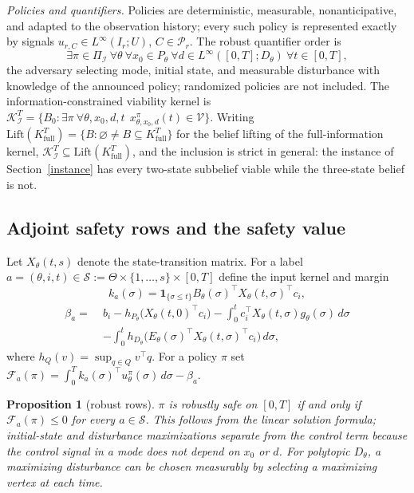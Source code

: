 \documentclass[10pt,twocolumn]{article}
\theoremstyle{plain}
\newtheorem{proposition}[theorem]{Proposition}
\theoremstyle{definition}
\theoremstyle{remark}
\begin{document}
\emph{Policies and quantifiers.} Policies are deterministic, measurable,
nonanticipative, and adapted to the observation history; every such policy is
represented exactly by signals \(u_{r,C} \in L^\infty(I_r; U)\),
\(C \in \mathcal{P}_r\). The robust quantifier order is
\[
\exists \pi \in \Pi_{\mathcal{I}}\ \forall \theta\ \forall x_0 \in P_\theta\
\forall d \in L^\infty([0,T]; D_\theta)\ \forall t \in [0,T],
\]
the adversary selecting mode, initial state, and measurable disturbance with
knowledge of the announced policy; randomized policies are not included. The
information-constrained viability kernel is
\(\mathcal{K}_{\mathcal{I}}^T = \{ B_0 : \exists \pi\ \forall \theta, x_0,
d, t\ \ x^{\pi}_{\theta, x_0, d}(t) \in \mathcal{V} \}\). Writing
\(\mathrm{Lift}(K^T_{\mathrm{full}}) = \{ B : \varnothing \ne B \subseteq
K^T_{\mathrm{full}} \}\) for the belief lifting of the full-information
kernel, \(\mathcal{K}_{\mathcal{I}}^T \subseteq
\mathrm{Lift}(K^T_{\mathrm{full}})\), and the inclusion is strict in general:
the instance of Section~\ref{instance} has every two-state subbelief viable
while the three-state belief is not.

\subsection{Adjoint safety rows and the safety value}\label{rows}

Let \(X_\theta(t,s)\) denote the state-transition matrix. For a label
\(a = (\theta, i, t) \in \mathscr{S} := \Theta \times \{1,\dots,s\} \times
[0,T]\) define the input kernel and margin
\[
k_a(\sigma) = \mathbf{1}_{\{\sigma \le t\}} B_\theta(\sigma)^\top
X_\theta(t,\sigma)^\top c_i,
\]
\begin{align*}
\beta_a = \;& b_i - h_{P_\theta}\!\bigl(X_\theta(t,0)^\top c_i\bigr)
- \int_0^t c_i^\top X_\theta(t,\sigma) g_\theta(\sigma)\, d\sigma\\
& - \int_0^t h_{D_\theta}\!\bigl(E_\theta(\sigma)^\top
X_\theta(t,\sigma)^\top c_i\bigr)\, d\sigma,
\end{align*}
where \(h_Q(v) = \sup_{q \in Q} v^\top q\). For a policy \(\pi\) set
\(\mathcal{F}_a(\pi) = \int_0^T k_a(\sigma)^\top u^\pi_\theta(\sigma)\,
d\sigma - \beta_a\).

\begin{proposition}[robust rows]\label{prop:rows}
\(\pi\) is robustly safe on \([0,T]\) if and only if
\(\mathcal{F}_a(\pi) \le 0\) for every \(a \in \mathscr{S}\). This follows
from the linear solution formula; initial-state and disturbance maximizations
separate from the control term because the control signal in a mode does not
depend on \(x_0\) or \(d\). For polytopic \(D_\theta\), a maximizing
disturbance can be chosen measurably by selecting a maximizing vertex at each
time.
\end{proposition}
\end{document}
